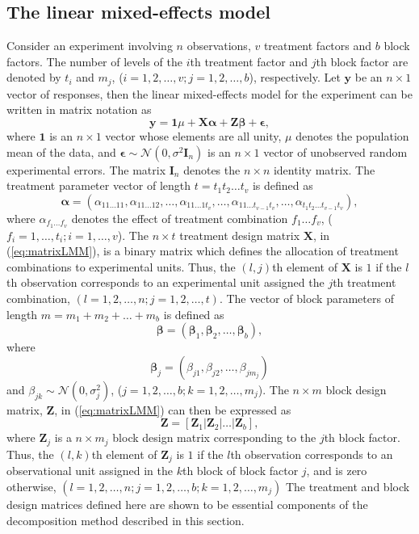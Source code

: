 \documentclass[article]{jss}
\newcommand{\I}{\mathbf{I}}
\newcommand{\Z}{\mathbf{Z}}
\newcommand{\X}{\mathbf{X}}
\begin{document}
\subsection{The linear mixed-effects model}
\label{subsec:matrixLMM}
Consider an experiment involving $n$ observations, $v$ treatment factors and $b$ block factors. The number of levels of the $i$th treatment factor and $j$th block factor are denoted by $t_i$ and $m_j$, ($i = 1,2, \dots, v; j = 1,2,\dots, b$), respectively. Let $\bm{y}$ be an $n \times 1$ vector of responses, then the linear mixed-effects model for the experiment can be written in matrix notation as
\begin{equation}\label{eq:matrixLMM}
\bm{y} = \mathbf{1}\mu + \X \bm{\alpha} + \Z\bm{\beta} + \bm{\epsilon},
\end{equation}
where $\mathbf{1}$ is an $n \times 1$ vector whose elements are all unity, $\mu$ denotes the population mean of the data, and $\bm{\epsilon}\sim \mathcal{N}(0,\sigma^2 \I_n)$ is an $n \times 1$ vector of unobserved random experimental errors. The matrix $\I_n$ denotes the $n \times n$ identity matrix. The treatment parameter vector of length $t = t_1 t_2  \dots  t_v$ is defined as 
\begin{equation}
\label{eq:treatPar}
\bm{\alpha} = (\alpha_{11 \dots 11}, \alpha_{11 \dots 12}, \dots,  \alpha_{1 1 \dots 1t_v},\dots,\alpha_{1 1 \dots t_{v-1}t_v},\dots,\alpha_{t_1 t_2 \dots t_{v-1}t_v}),
\end{equation}
where $\alpha_{f_1 \dots f_v}$ denotes the effect of treatment combination $f_1 \dots f_v$, ($f_i = 1, \dots, t_i; i = 1,\dots, v$). The $n \times t$ treatment design matrix $\X$, in (\ref{eq:matrixLMM}), is a binary matrix which defines the allocation of treatment combinations to experimental units. Thus, the $(l,j)$th element of $\X$ is $1$ if the $l$th observation corresponds to an experimental unit assigned the $j$th treatment combination, $(l=1,2,\dots,n; j=1,2,\dots, t )$. The vector of block parameters of length $m = m_1 + m_2  + \dots + m_b$ is defined as
\begin{equation}\label{eq:block1Par}
\bm{\beta} = (\bm{\beta}_1, \bm{\beta}_2, \ldots, \bm{\beta}_b), 
\end{equation} 
where
\[
\bm{\beta}_j = (\beta_{j1}, \beta_{j2}, \dots, \beta_{j m_j})
\]
and 
$\beta_{jk} \sim \mathcal{N}(0, \sigma_j^2)$, ($j=1,2,\dots,b; k=1,2,\dots, m_j$). The $n \times m$ block design matrix, $\Z$, in (\ref{eq:matrixLMM}) can then be expressed as 
\begin{equation}\label{eq:block1Mat}
\Z = [\Z_1 \vert \Z_2 \vert \ldots \vert \Z_b],
\end{equation}
where $\Z_j$ is a $n \times m_j$ block design matrix corresponding to the $j$th block factor. Thus, the $(l,k)$th element of $\Z_j$ is $1$ if the $l$th observation corresponds to an observational unit assigned in the $k$th block of block factor $j$, and is zero otherwise, $(l=1,2,\dots,n; j=1,2,\dots,b; k=1,2,\dots, m_j)$ The treatment and block design matrices defined here are shown to be essential components of the decomposition method described in this section. 
\end{document}
